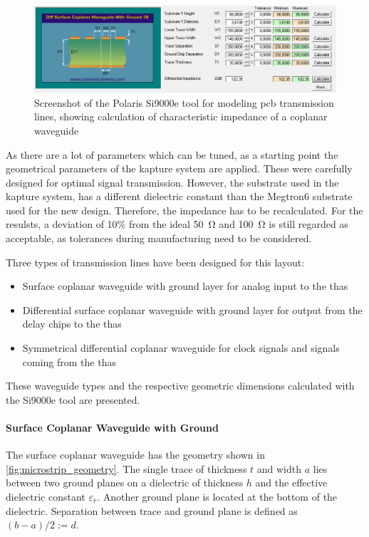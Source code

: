 \begin{figure}[tbh]
	\centering
	\includegraphics[width = \textwidth]{chap/04-theresa/img/polaris}
	\caption[Screenshot of the Polaris Si9000e]{Screenshot of the Polaris Si9000e tool for modeling \gls{pcb} transmission lines, showing calculation of characteristic impedance of a coplanar waveguide}
	\label{fig:polaris}
\end{figure}

As there are a lot of parameters which can be tuned, as a starting point the geometrical parameters of the \gls{kapture} system are applied. 
These were carefully designed for optimal signal transmission.
However, the substrate used in the \gls{kapture} system, has a different dielectric constant than the Megtron6 substrate used for the new design. 
Therefore, the impedance has to be recalculated. 
For the resulsts, a deviation of 10\% from the ideal \SI{50}{\ohm} and \SI{100}{\ohm} is still regarded as acceptable, as tolerances during manufacturing need to be considered.

Three types of transmission lines have been designed for this layout:
\begin{itemize}
	\item Surface coplanar waveguide with ground layer for analog input to the \glspl{tha} 
	\item Differential surface coplanar waveguide with ground layer for output from the delay chips to the \glspl{tha}
	\item Symmetrical differential coplanar waveguide for clock signals and signals coming from the \glspl{tha}
\end{itemize}
These waveguide types and the respective geometric dimensions calculated with the Si9000e tool are presented.

\paragraph{Surface Coplanar Waveguide with Ground}
The surface coplanar waveguide has the geometry shown in \autoref{fig:microstrip_geometry}.
The single trace of thickness $t$ and width $a$ lies between two ground planes on a dielectric of thickness $h$ and the effective dielectric constant $\varepsilon_r$.
Another ground plane is located at the bottom of the dielectric.
Separation between trace and ground plane is defined as $(b-a)/2 := d$. 


